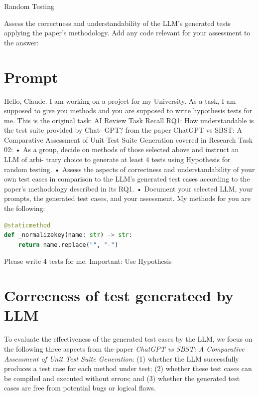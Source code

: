 \documentclass[a4paper]{scrreprt}
\newcounter{question}
\begin{document}
\begin{question}{Random Testing}
\begin{enumerate}[topsep=0pt, leftmargin=*]
\begin{answer}


          \end{answer}
  \end{enumerate}
\end{question}

\begin{aiTask}
  Assess the correctness and understandability of the LLM's generated tests applying the paper's methodology. Add any code relevant for your assessment to the answer:
  \begin{answer}

\section*{Prompt}
Hello, Claude. I am working on a project for my University. As a task, I am supposed to give you methods and you are supposed to write hypothesis tests for me. This is the original task: AI Review Task Recall RQ1: How understandable is the test suite provided by Chat- GPT? from the paper ChatGPT vs SBST: A Comparative Assessment of Unit Test Suite Generation covered in Research Task 02: • As a group, decide on methods of those selected above and instruct an LLM of arbi- trary choice to generate at least 4 tests using Hypothesis for random testing. • Assess the aspects of correctness and understandability of your own test cases in comparison to the LLM’s generated test cases according to the paper’s methodology described in its RQ1. • Document your selected LLM, your prompts, the generated test cases, and your assessment. My methods for you are the following: 


\begin{lstlisting}[language=Python]
@staticmethod
def _normalizekey(name: str) -> str:
    return name.replace("", "-")
\end{lstlisting}

Please write 4 tests for me. Important: Use Hypothesis



\section*{Correcness of test generateed by LLM}

To evaluate the effectiveness of the generated test cases by the LLM, we focus on the following three aspects from the paper \textit{ChatGPT vs SBST: A Comparative Assessment of Unit Test Suite Generation}:
(1) whether the LLM successfully produces a test case for each method under test;
(2) whether these test cases can be compiled and executed without errors; and
(3) whether the generated test cases are free from potential bugs or logical flaws.


\end{answer}
\end{aiTask}
\end{document}
